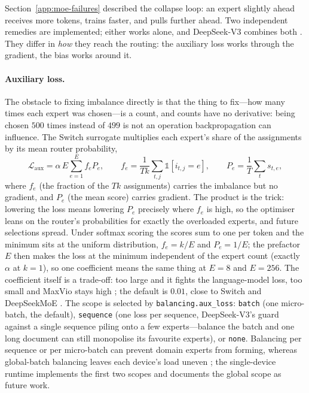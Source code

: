 Section~\ref{app:moe-failures} described the collapse loop: an expert
slightly ahead receives more tokens, trains faster, and pulls further ahead.
Two independent remedies are implemented; either works alone, and DeepSeek-V3
combines both \citep{deepseek2024v3}. They differ in \emph{how} they reach
the routing: the auxiliary loss works through the gradient, the bias works
around it.

\paragraph{Auxiliary loss.}
The obstacle to fixing imbalance directly is that the thing to fix---how many
times each expert was chosen---is a count, and counts have no derivative:
being chosen $500$ times instead of $499$ is not an operation backpropagation
can influence. The Switch surrogate \citep{fedus2021switch} multiplies each
expert's share of the assignments by its mean router probability,
\begin{equation}
  \mathcal{L}_{\text{aux}} = \alpha\,E \sum_{e=1}^{E} f_e P_e,
  \qquad
  f_e = \frac{1}{Tk}\sum_{t,j}\mathbb{1}[i_{t,j}=e],
  \qquad
  P_e = \frac{1}{T}\sum_{t} s_{t,e},
  \label{eq:aux}
\end{equation}
where $f_e$ (the fraction of the $Tk$ assignments) carries the imbalance but
no gradient, and $P_e$ (the mean score) carries gradient. The product is the
trick: lowering the loss means lowering $P_e$ precisely where $f_e$ is high,
so the optimiser leans on the router's probabilities for exactly the
overloaded experts, and future selections spread. Under softmax scoring the
scores sum to one per token and the minimum sits at the uniform
distribution, $f_e = k/E$ and $P_e = 1/E$; the prefactor $E$ then makes the
loss at the minimum independent of the expert count (exactly $\alpha$ at
$k{=}1$), so one coefficient means the same thing at $E{=}8$ and $E{=}256$.
The coefficient itself is a trade-off: too large and it fights the
language-model loss, too small and MaxVio stays high
\citep{wang2024auxfree}; the default is $0.01$, close to Switch and
DeepSeekMoE \citep{fedus2021switch,dai2024deepseekmoe}. The scope is
selected by \texttt{balancing.aux\_loss}: \texttt{batch} (one micro-batch,
the default), \texttt{sequence} (one loss per sequence, DeepSeek-V3's guard
against a single sequence piling onto a few experts---balance the batch and
one long document can still monopolise its favourite experts), or
\texttt{none}. Balancing per sequence or per micro-batch can prevent domain
experts from forming, whereas global-batch balancing leaves each device's
load uneven \citep{qiu2025demons}; the single-device runtime implements the
first two scopes and documents the global scope as future work.

